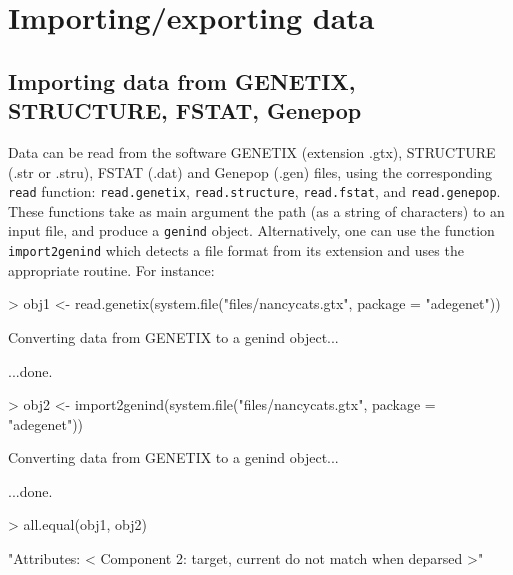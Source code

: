 \documentclass{article}
\begin{document}
\newpage
\section{Importing/exporting data}


\subsection{Importing data from GENETIX, STRUCTURE, FSTAT, Genepop}

Data can be read from the software GENETIX (extension .gtx), STRUCTURE (.str or
.stru), FSTAT (.dat) and Genepop (.gen) files, using the corresponding
\texttt{read} function: \texttt{read.genetix},  \texttt{read.structure},
\texttt{read.fstat}, and  \texttt{read.genepop}.
These functions take as main argument the path (as a string of characters) to an input file, and produce a \texttt{genind} object.
Alternatively, one can use the function \texttt{import2genind} which detects a file format from its extension and uses the appropriate routine.
For instance:
\begin{Schunk}
\begin{Sinput}
> obj1 <- read.genetix(system.file("files/nancycats.gtx", package = "adegenet"))
\end{Sinput}
\begin{Soutput}
 Converting data from GENETIX to a genind object... 

...done.
\end{Soutput}
\begin{Sinput}
> obj2 <- import2genind(system.file("files/nancycats.gtx", package = "adegenet"))
\end{Sinput}
\begin{Soutput}
 Converting data from GENETIX to a genind object... 

...done.
\end{Soutput}
\begin{Sinput}
> all.equal(obj1, obj2)
\end{Sinput}
\begin{Soutput}
[1] "Attributes: < Component 2: target, current do not match when deparsed >"
\end{Soutput}
\end{Schunk}
\end{document}
